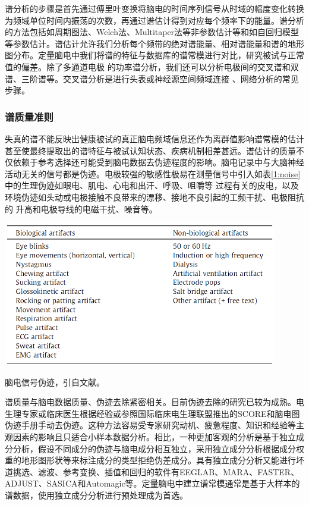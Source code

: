谱分析的步骤是首先通过傅里叶变换将脑电的时间序列信号从时域的幅度变化转换为频域单位时间内振荡的次数，再通过谱估计得到对应每个频率下的能量。谱分析的方法包括如周期图法、Welch法、Multitaper法等非参数估计等和如自回归模型等参数估计。谱估计允许我们分析每个频带的绝对谱能量、相对谱能量和谱的地形图分布。定量脑电中我们将谱的特征与数据库的谱常模进行对比，研究被试与正常值的偏差。除了多通道电极
的功率谱分析，我们还可以分析电极间的交叉谱和双谱、三阶谱等。交叉谱分析是进行头表或神经源空间频域连接
、网络分析的常见步骤。

\subsubsection{谱质量准则}
失真的谱不能反映出健康被试的真正脑电频域信息还作为离群值影响谱常模的估计甚至使最终提取出的谱特征与被试认知状态、疾病机制相差甚远。谱估计的质量不仅依赖于参考选择还可能受到脑电数据去伪迹程度的影响。脑电记录中与大脑神经活动无关的信号都是伪迹。电极较强的敏感性极易在测量信号中引入如表\ref{1:noise}中的生理伪迹如眼电、肌电、心电和出汗、呼吸、咀嚼等
过程有关的皮电，以及环境伪迹如头动或电极接触不良带来的漂移、接地不良引起的工频干扰、电极阻抗的
升高和电极导线的电磁干扰、噪音等。
\begin{table}[!h]
	\includegraphics[width=12cm]{pic/xulun/EEGnoise.png}
	\caption{脑电信号伪迹，引自文献。}
	\label{1:noise}
\end{table}

谱质量与脑电数据质量、伪迹去除紧密相关。目前伪迹去除的研究已较为成熟。电生理专家或临床医生根据经验或参照国际临床电生理联盟推出的SCORE和脑电图伪迹手册手动去伪迹。这种方法容易受专家研究动机、疲惫程度、知识和经验等主观因素的影响且只适合小样本数据分析。相比，一种更加客观的分析是基于独立成分分析，假设不同成分的伪迹与脑电成分相互独立，采用独立成分分析根据成分权重的地形图形状等来标注成分的类型拒绝伪差成分。具有独立成分分析又能进行坏道挑选、滤波、参考变换、插值和回归的软件有EEGLAB、MARA、FASTER、ADJUST、SASICA和Automagic等。定量脑电中建立谱常模通常是基于大样本的谱数据，使用独立成分分析进行预处理成为首选。

